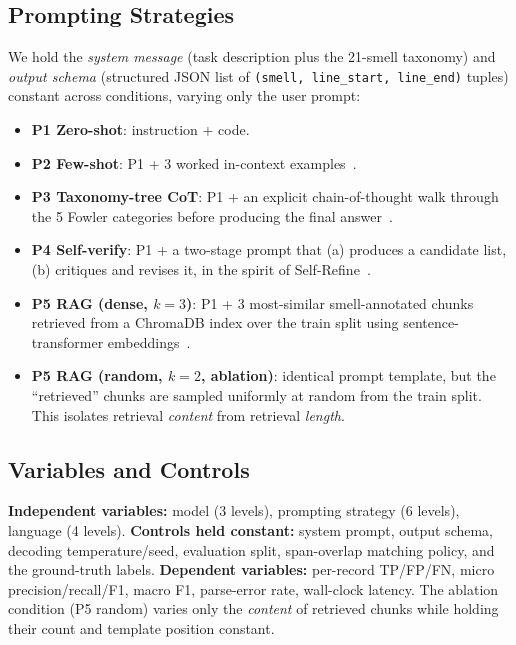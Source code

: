 \documentclass[conference]{IEEEtran}
\begin{document}
\subsection{Prompting Strategies}
We hold the \emph{system message} (task description plus the 21-smell taxonomy)
and \emph{output schema} (structured JSON list of \texttt{(smell, line\_start,
line\_end)} tuples) constant across conditions, varying only the user prompt:
\begin{itemize}
 \item \textbf{P1 Zero-shot}: instruction + code.
 \item \textbf{P2 Few-shot}: P1 + 3 worked in-context
 examples~\cite{brown2020fewshot}.
 \item \textbf{P3 Taxonomy-tree CoT}: P1 + an explicit chain-of-thought walk
 through the 5 Fowler categories before producing the final
 answer~\cite{wei2022cot}.
 \item \textbf{P4 Self-verify}: P1 + a two-stage prompt that (a) produces a
 candidate list, (b) critiques and revises it, in the spirit of
 Self-Refine~\cite{madaan2023selfrefine}.
 \item \textbf{P5 RAG (dense, $k{=}3$)}: P1 + 3 most-similar smell-annotated
 chunks retrieved from a ChromaDB index over the train split using
 sentence-transformer embeddings~\cite{reimers2019sbert}.
 \item \textbf{P5 RAG (random, $k{=}2$, ablation)}: identical prompt template,
 but the ``retrieved'' chunks are sampled uniformly at random from the train
 split. This isolates retrieval \emph{content} from retrieval \emph{length}.
\end{itemize}

\subsection{Variables and Controls}
\textbf{Independent variables:} model (3 levels), prompting strategy (6 levels),
language (4 levels). \textbf{Controls held constant:} system prompt, output
schema, decoding temperature/seed, evaluation split, span-overlap matching policy,
and the ground-truth labels. \textbf{Dependent variables:} per-record TP/FP/FN,
micro precision/recall/F1, macro F1, parse-error rate, wall-clock latency. The
ablation condition (P5 random) varies only the \emph{content} of retrieved chunks
while holding their count and template position constant.
\end{document}

